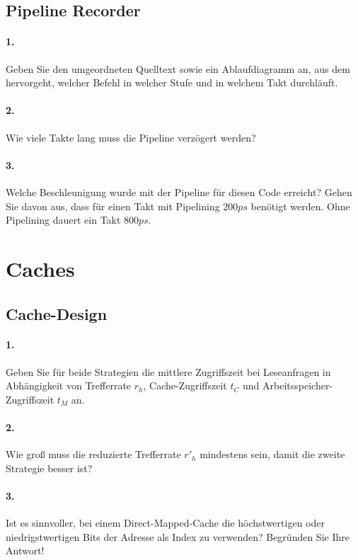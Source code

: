 \documentclass[paper=a4, fontsize=11pt]{scrartcl}
\numberwithin{equation}{section}
\numberwithin{figure}{section}
\numberwithin{table}{section}
\begin{document}
\subsection{Pipeline Recorder}

\paragraph{1.}
Geben Sie den umgeordneten Quelltext sowie ein Ablaufdiagramm an, aus dem hervorgeht, welcher Befehl in welcher Stufe und in welchem Takt durchläuft.

\paragraph{2.}
Wie viele Takte lang muss die Pipeline verzögert werden?

\paragraph{3.}
Welche Beschleunigung wurde mit der Pipeline für diesen Code erreicht? Gehen Sie davon aus, dass für einen Takt mit Pipelining $200 ps$ benötigt werden. Ohne Pipelining dauert ein Takt $800 ps$.

\section{Caches}
\subsection{Cache-Design}

\paragraph{1.}
Geben Sie für beide Strategien die mittlere Zugriffszeit bei Leseanfragen in Abhängigkeit von Trefferrate $r_{h}$, Cache-Zugriffszeit $t_{C}$ und Arbeitsspeicher-Zugriffszeit $t_{M}$ an.

\paragraph{2.}
Wie groß muss die reduzierte Trefferrate $r'_{h}$ mindestens sein, damit die zweite Strategie besser ist?

\paragraph{3.}
Ist es sinnvoller, bei einem Direct-Mapped-Cache die höchstwertigen oder niedrigstwertigen Bits der Adresse als Index zu verwenden? Begründen Sie Ihre Antwort!
\end{document}
